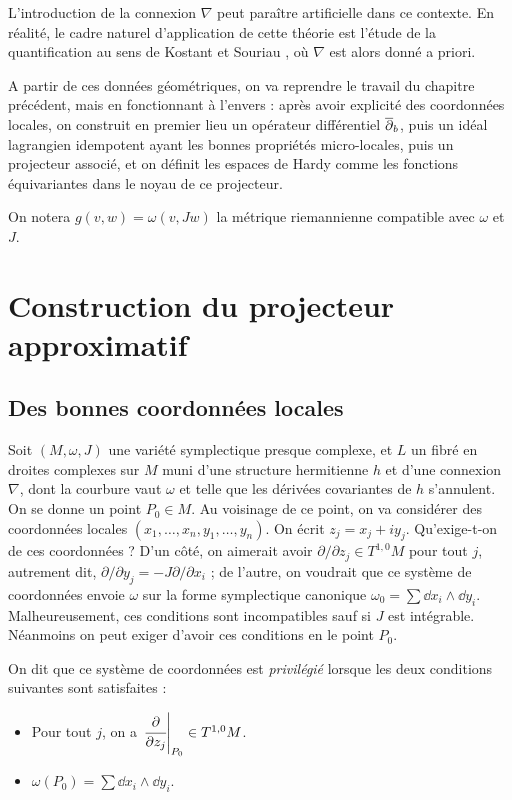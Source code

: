 \begin{rem}L'introduction de la connexion $\nabla$ peut paraître artificielle dans ce contexte. En réalité, le cadre naturel d'application de cette théorie est l'étude de la quantification au sens de Kostant \cite{kostant1970quantization} et Souriau \cite{souriau1967quantification}, où $\nabla$ est alors donné a priori.\end{rem}

A partir de ces données géométriques, on va reprendre le travail du
chapitre précédent, mais en fonctionnant à l'envers : après avoir
explicité des coordonnées locales, on construit en premier lieu un
opérateur différentiel $\overline{\partial}_b$, puis un idéal lagrangien idempotent
ayant les bonnes propriétés micro-locales, puis un projecteur associé, et on définit les espaces de Hardy comme les fonctions équivariantes dans le noyau de ce projecteur.

On notera $g(v,w)=\omega(v,Jw)$ la métrique riemannienne compatible avec $\omega$ et $J$.

\section{Construction du projecteur approximatif}

\subsection{Des bonnes coordonnées locales}

Soit $(M,\omega,J)$ une variété symplectique presque complexe, et $L$ un fibré en
droites complexes sur $M$ muni d'une structure hermitienne $h$ et
d'une connexion $\nabla$, dont la courbure vaut $\omega$ et telle que
les dérivées covariantes de $h$ s'annulent. On se donne un point $P_0
\in M$. Au voisinage de ce point, on va considérer des coordonnées
locales $(x_1,\ldots, x_n,y_1,\ldots, y_n)$. On écrit
$z_j=x_j+iy_j$. Qu'exige-t-on de ces coordonnées ? D'un côté, on
aimerait avoir $\partial/\partial z_j \in T^{1,0}M$ pour tout $j$,
autrement dit, $\partial/\partial y_j = -J\partial/\partial x_i$ ; de
l'autre, on voudrait que ce système de coordonnées envoie $\omega$ sur
la forme symplectique canonique $\omega_0 = \sum \dd x_i \wedge \dd
y_i$. Malheureusement, ces conditions sont incompatibles sauf si $J$
est intégrable. Néanmoins on peut exiger d'avoir ces conditions en le
point $P_0$.

\begin{defn}
	On dit que ce système de coordonnées est \emph{privilégié} lorsque les deux conditions suivantes sont satisfaites :
	\begin{itemize}
		\item Pour tout $j$, on a $\left.\cfrac{\partial}{\partial z_j}\right|_{P_0} \in T^{1,0}M$.
		\item $\omega(P_0)=\sum \dd x_i \wedge \dd y_i$.
	\end{itemize}
\end{defn}

